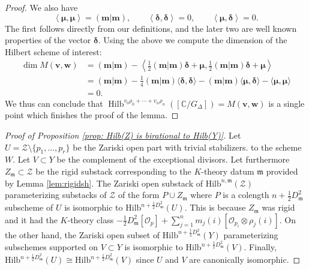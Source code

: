 \documentclass{amsart}
\theoremstyle{definition}
\newcommand{\half}{\frac{1}{2}}
\newcommand{\CC} {{\mathbb C}}          %
\newcommand{\mdata}{\mathfrak{m}}
\renewcommand{\O}{\mathcal{O}}
\newcommand{\Zcal}{\mathcal{Z}}
\newcommand{\mvec}{\bm{m}}
\newcommand{\deltavec}{\bm{\delta  }}
\newcommand{\muvec}{\bm{\mu  }}
\newcommand{\vvec}{\bm{v }}
\newcommand{\wvec}{\bm{w }}
\newcommand{\Hilb}{\operatorname{Hilb}}
\begin{document}
\begin{proof}
We also have
\[
\left\langle \muvec ,\muvec \right\rangle = (\mvec |\mvec ),\quad
\quad \left\langle \deltavec ,\deltavec \right\rangle = 0, \quad \quad
\left\langle \muvec ,\deltavec \right\rangle = 0.
\]
The first follows directly from our definitions, and the later two are
well known properties of the vector $\deltavec$.  Using the above we
compute the dimension of the Hilbert scheme of interest:
\begin{align*}
\dim M(\vvec ,\wvec ) &=
(\mvec| \mvec ) - \left\langle
\half ( \mvec| \mvec )\deltavec+\muvec ,\half ( \mvec| \mvec )\deltavec+\muvec  \right\rangle \\
& = (\mvec| \mvec )  -\frac{1}{4} ( \mvec|
\mvec)\langle \deltavec, \deltavec \rangle  - ( \mvec|
\mvec) \langle \muvec, \deltavec \rangle  - \langle \muvec, \muvec \rangle\\
& = 0.
\end{align*}
We thus can conclude that $\Hilb^{v_{0}\rho_{0}+\dotsb
+v_{n}\rho_{n}}([\CC /G_{\Delta}]) = M(\vvec ,\wvec )$ is a single
point which finishes the proof of the lemma.
\end{proof}



\begin{proof}[Proof of Proposition \ref{prop: Hilb(Z) is birational to
Hilb(Y)}] Let $U= \Zcal \setminus \{p_{1},\dotsc ,p_{r} \}$ be the
Zariski open part with trivial stabilizers. %
to the scheme $W$.  Let $V \subset Y$ be the complement of the
exceptional divisors.  Let furthermore $Z_{\mdata} \subset
\mathcal{Z}$ be the rigid substack corresponding to the $K$-theory
datum $\mdata$ provided by Lemma \ref{lem:rigidsh}.  The Zariski open
substack of $\mathrm{Hilb}^{n,\mdata}(\Zcal)$ parameterizing substacks
of $\Zcal$ of the form $P \cup Z_{\mdata}$ where $P$ is a colength
$n+\half D_{\mdata}^{2}$ subscheme of $U$ is isomorphic to
$\mathrm{Hilb}^{n+\half D_{\mdata}^{2}}(U)$. This is because
$Z_{\mdata}$ was rigid and it had the $K$-theory class $-\half
D_{\mdata}^{2}[\O_{p}] + \sum_{j=1}^{n} m_{j}(i)[\O_{p_i}\otimes
\rho_{j}(i)]$. On the other hand, the Zariski open subset of
$\mathrm{Hilb}^{n+\half D_{\mdata}^{2}}(Y)$ parameterizing subschemes
supported on $V\subset Y$ is isomorphic to $\mathrm{Hilb}^{n+\half
D_{\mdata}^{2}}(V)$. Finally, $\mathrm{Hilb}^{n+\half
D_{\mdata}^{2}}(U)\cong \mathrm{Hilb}^{n+\half D_{\mdata}^{2}}(V)$
since $U$ and $V$ are canonically isomorphic.
\end{proof}
\end{document}
